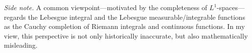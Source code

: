 \documentclass[12pt,b5paper,notitlepage]{article}
\theoremstyle{definition}
\theoremstyle{plain}
\newcommand{\ovl}{\overline}
\newcommand{\bk}[1]{\langle {#1}\rangle}
\newcommand{\Zbb}{\mathbb Z}
\numberwithin{equation}{section}
\begin{document}
\begin{comment}
Let us return to Hilbert’s contribution in \cite{Hil06} from the perspective of moment problems. 
\begin{itemize}
\item In his study of integral equations, Hilbert introduced the general notion of weak convergence in $l^2(\Zbb)$, which takes the form of pointwise convergence of moments and anticipates the future notion of  weak-* convergence. 

More specifically, Hilbert considered a completely continuous, self-adjoint, bounded linear operator\footnote{More precisely, Hilbert worked with a bilinear form.} $T$ on $l^2(\Zbb)$, and his goal was to find the eigenvectors of $T$. To identify an eigenvector $\xi\in l^2(\Zbb)$ of unit norm corresponding to the largest (real) eigenvalue $\lambda$, he constructed a sequence $(\xi_n)$ in the closed unit ball $\ovl B_{l^2(\Zbb)}(0,1)$ such that $\bk{T\xi_n|\xi_n}\rightarrow\lambda$, and that $(\xi_n)$ converges weakly to some $\xi\in \ovl B_{l^2(\Zbb)}(0,1)$. 
\item In his proof of the spectral theorem for bounded self-adjoint operators on $l^2(\Zbb)$---not necessarily completely continuous---Hilbert approximated the continuous spectrum using discrete spectra. This approximation takes the form of the convergence of a sequence of increasing functions $\rho_n\rightarrow\rho$. This mode of convergence is more general than that used earlier by Stieltjes in his study of continued fractions---just as the convergence of moments described in \eqref{eq9} is a generalization of the more specific form given in \eqref{eq5}.\footnote{Hilbert did not express his approximation in terms of the pointwise convergence of moments. This reformulation, connecting Hilbert's approach to the framework of moment problems and dual spaces, was later introduced by Riesz in \cite{Rie13}.}
\end{itemize}


For a detailed discussion of the first part, see \cite[Sec. 22.5]{Gui-A}; we will also revisit this topic in Ch. 6. The second part will be addressed in the following chapter.
\end{comment}



\noindent \small\textit{Side note.}  A common viewpoint---motivated by the completeness of $L^1$-spaces---regards the Lebesgue integral and the Lebesgue measurable/integrable functions as the Cauchy completion of Riemann integrals and continuous functions. In my view, this perspective is not only historically inaccurate, but also mathematically misleading.
\end{document}
